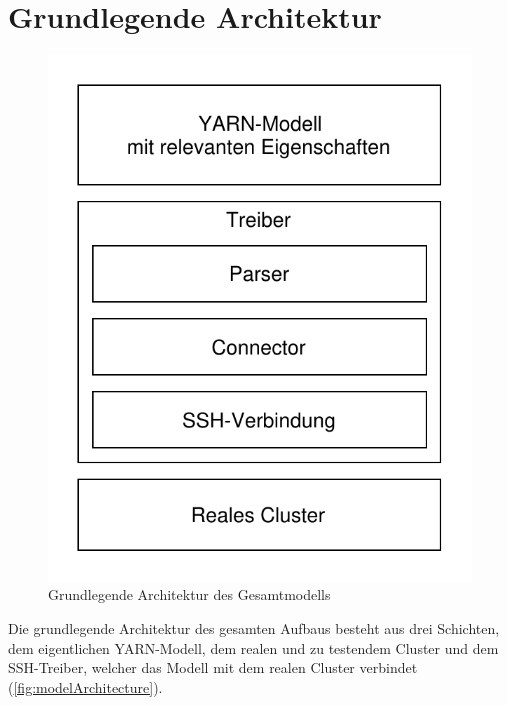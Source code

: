 \section{Grundlegende Architektur}\label{sec:architecture}

\begin{figure}
	\centering
	\includegraphics[width=.8\columnwidth]{./images/modelArchitecture.pdf}
	\caption{Grundlegende Architektur des Gesamtmodells}
	\label{fig:modelArchitecture}
\end{figure}

Die grundlegende Architektur des gesamten Aufbaus besteht aus drei Schichten, dem eigentlichen YARN-Modell, dem realen und zu testendem Cluster und dem SSH-Treiber, welcher das Modell mit dem realen Cluster verbindet (\autoref{fig:modelArchitecture}).